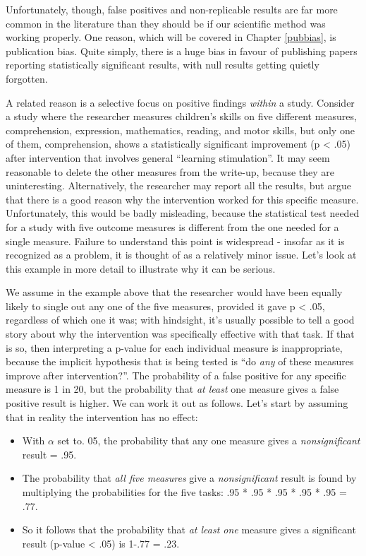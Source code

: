 \documentclass{krantz}
\providecommand{\tightlist}{%
\setlength{\itemsep}{0pt}\setlength{\parskip}{0pt}}
\begin{document}
Unfortunately, though, false positives and non-replicable results are far more common in the literature than they should be if our scientific method was working properly. One reason, which will be covered in Chapter \ref{pubbias}, is publication bias. Quite simply, there is a huge bias in favour of publishing papers reporting statistically significant results, with null results getting quietly forgotten.

A related reason is a selective focus on positive findings \emph{within} a study. Consider a study where the researcher measures children's skills on five different measures, comprehension, expression, mathematics, reading, and motor skills, but only one of them, comprehension, shows a statistically significant improvement (p \textless{} .05) after intervention that involves general ``learning stimulation''. It may seem reasonable to delete the other measures from the write-up, because they are uninteresting. Alternatively, the researcher may report all the results, but argue that there is a good reason why the intervention worked for this specific measure. Unfortunately, this would be badly misleading, because the statistical test needed for a study with five outcome measures is different from the one needed for a single measure. Failure to understand this point is widespread - insofar as it is recognized as a problem, it is thought of as a relatively minor issue. Let's look at this example in more detail to illustrate why it can be serious.

We assume in the example above that the researcher would have been equally likely to single out any one of the five measures, provided it gave p \textless{} .05, regardless of which one it was; with hindsight, it's usually possible to tell a good story about why the intervention was specifically effective with that task. If that is so, then interpreting a p-value for each individual measure is inappropriate, because the implicit hypothesis that is being tested is ``do \emph{any} of these measures improve after intervention?''. The probability of a false positive for any specific measure is 1 in 20, but the probability that \emph{at least} one measure gives a false positive result is higher. We can work it out as follows. Let's start by assuming that in reality the intervention has no effect:

\begin{itemize}
\tightlist
\item
  With \(\alpha\) set to. 05, the probability that any one measure gives a \emph{nonsignificant} result = .95.
\item
  The probability that \emph{all five measures} give a \emph{nonsignificant} result is found by multiplying the probabilities for the five tasks: .95 * .95 * .95 * .95 * .95 = .77.
\item
  So it follows that the probability that \emph{at least one} measure gives a significant result (p-value \textless{} .05) is 1-.77 = .23.
\end{itemize}
\end{document}
